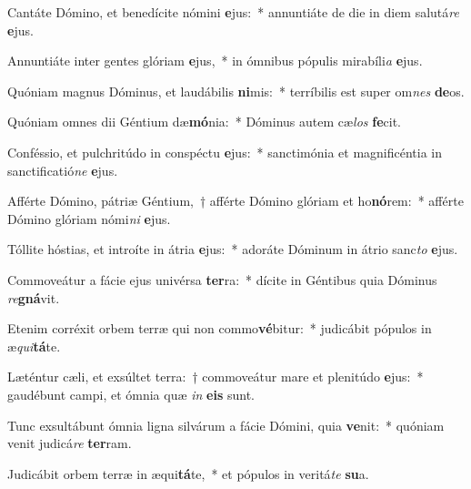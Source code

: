 \item Cantáte Dómino, et benedícite nómini \textbf{e}jus:~* annuntiáte de die in diem salutá\textit{re} \textbf{e}jus.
\item Annuntiáte inter gentes glóriam \textbf{e}jus,~* in ómnibus pópulis mirabíli\textit{a} \textbf{e}jus.
\item Quóniam magnus Dóminus, et laudábilis \textbf{ni}mis:~* terríbilis est super om\textit{nes} \textbf{de}os.
\item Quóniam omnes dii Géntium dæ\textbf{mó}nia:~* Dóminus autem cæ\textit{los} \textbf{fe}cit.
\item Conféssio, et pulchritúdo in conspéctu \textbf{e}jus:~* sanctimónia et magnificéntia in sanctificatió\textit{ne} \textbf{e}jus.
\item Afférte Dómino, pátriæ Géntium,~† afférte Dómino glóriam et ho\textbf{nó}rem:~* afférte Dómino glóriam nómi\textit{ni} \textbf{e}jus.
\item Tóllite hóstias, et introíte in átria \textbf{e}jus:~* adoráte Dóminum in átrio sanc\textit{to} \textbf{e}jus.
\item Commoveátur a fácie ejus univérsa \textbf{ter}ra:~* dícite in Géntibus quia Dóminus \textit{re}\textbf{gná}vit.
\item Etenim corréxit orbem terræ qui non commo\textbf{vé}bitur:~* judicábit pópulos in æ\textit{qui}\textbf{tá}te.
\item Læténtur cæli, et exsúltet terra:~† commoveátur mare et plenitúdo \textbf{e}jus:~* gaudébunt campi, et ómnia quæ \textit{in} \textbf{e}\textbf{is} sunt.
\item Tunc exsultábunt ómnia ligna silvárum a fácie Dómini, quia \textbf{ve}nit:~* quóniam venit judicá\textit{re} \textbf{ter}ram.
\item Judicábit orbem terræ in æqui\textbf{tá}te,~* et pópulos in veritá\textit{te} \textbf{su}a.
